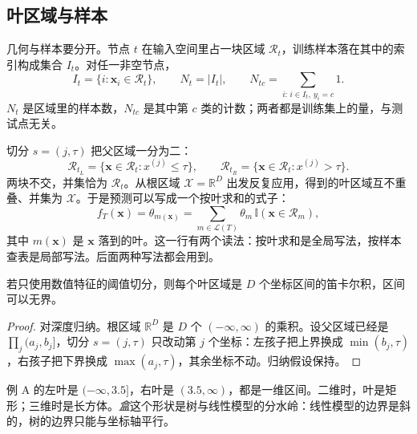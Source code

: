 \documentclass[11pt,a4paper,fontset=windows,zihao=-4]{ctexart}
\newcommand{\R}{\mathbb{R}}
\newcommand{\bx}{\boldsymbol{x}}
\newcommand{\Lcal}{\mathcal{L}}
\newcommand{\Rcal}{\mathcal{R}}
\newcommand{\Xcal}{\mathcal{X}}
\newcommand{\Ind}{\mathbb{I}}
\begin{document}
\subsection{叶区域与样本}

几何与样本要分开。节点 $t$ 在输入空间里占一块区域 $\Rcal_t$，训练样本落在其中的索引构成集合 $I_t$。对任一非空节点，
\begin{equation}
  I_t=\{i:\bx_i\in\Rcal_t\},\qquad
  N_t=\lvert I_t\rvert,\qquad
  N_{tc}=\sum_{i:\,i\in I_t,\ y_i=c}1 .
  \label{eq:counts}
\end{equation}
$N_t$ 是区域里的样本数，$N_{tc}$ 是其中第 $c$ 类的计数；两者都是训练集上的量，与测试点无关。

切分 $s=(j,\tau)$ 把父区域一分为二：
\begin{equation}
  \Rcal_{t_L}=\{\bx\in\Rcal_t:x^{(j)}\le\tau\},\qquad
  \Rcal_{t_R}=\{\bx\in\Rcal_t:x^{(j)}>\tau\}.
  \label{eq:splitregion}
\end{equation}
两块不交，并集恰为 $\Rcal_t$。从根区域 $\Xcal=\R^D$ 出发反复应用，得到的叶区域互不重叠、并集为 $\Xcal$。于是预测可以写成一个按叶求和的式子：
\begin{equation}
  f_T(\bx)=\theta_{m(\bx)}
  =\sum_{m\in\Lcal(T)}\theta_m\,\Ind(\bx\in\Rcal_m),
  \label{eq:ftree}
\end{equation}
其中 $m(\bx)$ 是 $\bx$ 落到的叶。这一行有两个读法：按叶求和是全局写法，按样本查表是局部写法。后面两种写法都会用到。

\begin{prop}[叶区域是轴平行盒]
若只使用数值特征的阈值切分，则每个叶区域是 $D$ 个坐标区间的笛卡尔积，区间可以无界。
\end{prop}

\begin{proof}
对深度归纳。根区域 $\R^D$ 是 $D$ 个 $(-\infty,\infty)$ 的乘积。设父区域已经是 $\prod_j(a_j,b_j]$，切分 $s=(j,\tau)$ 只改动第 $j$ 个坐标：左孩子把上界换成 $\min(b_j,\tau)$，右孩子把下界换成 $\max(a_j,\tau)$，其余坐标不动。归纳假设保持。
\end{proof}

例 A 的左叶是 $(-\infty,3.5]$，右叶是 $(3.5,\infty)$，都是一维区间。二维时，叶是矩形；三维时是长方体。\emph{盒}这个形状是树与线性模型的分水岭：线性模型的边界是斜的，树的边界只能与坐标轴平行。
\end{document}
